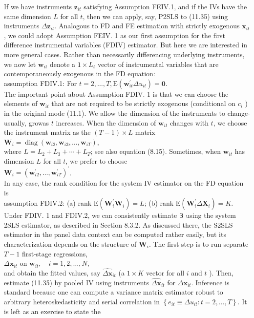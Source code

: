 \documentclass[10pt]{article}
\begin{document}
If we have instruments $\mathbf{z}_{i t}$ satisfying Assumption FEIV.1, and if the IVs have the same dimension $L$ for all $t$, then we can apply, say, P2SLS to (11.35) using instruments $\Delta \mathbf{z}_{i t}$. Analogous to FD and FE estimation with strictly exogenous $\mathbf{x}_{i t}$, we could adopt Assumption FEIV. 1 as our first assumption for the first difference instrumental variables (FDIV) estimator. But here we are interested in more general cases. Rather than necessarily differencing underlying instruments, we now let $\mathbf{w}_{i t}$ denote a $1 \times L_{t}$ vector of instrumental variables that are contemporaneously exogenous in the FD equation:\\
assumption FDIV.1: For $t=2, \ldots, T, \mathrm{E}\left(\mathbf{w}_{i t}^{\prime} \Delta u_{i t}\right)=\mathbf{0}$.\\
The important point about Assumption FDIV. 1 is that we can choose the elements of $\mathbf{w}_{i t}$ that are not required to be strictly exogenous (conditional on $c_{i}$ ) in the original mode (11.1). We allow the dimension of the instruments to change-usually, growas $t$ increases. When the dimension of $\mathbf{w}_{i t}$ changes with $t$, we choose the instrument matrix as the $(T-1) \times L$ matrix\\
$\mathbf{W}_{i}=\operatorname{diag}\left(\mathbf{w}_{i 2}, \mathbf{w}_{i 3}, \ldots, \mathbf{w}_{i T}\right)$,\\
where $L=L_{2}+L_{3}+\cdots+L_{T}$; see also equation (8.15). Sometimes, when $\mathbf{w}_{i t}$ has dimension $L$ for all $t$, we prefer to choose\\
$\mathbf{W}_{i}=\left(\mathbf{w}_{i 2}^{\prime}, \ldots, \mathbf{w}_{i T}^{\prime}\right)^{\prime}$.\\
In any case, the rank condition for the system IV estimator on the FD equation is\\
assumption FDIV.2: (a) rank $\mathrm{E}\left(\mathbf{W}_{i}^{\prime} \mathbf{W}_{i}\right)=L$; (b) rank $\mathrm{E}\left(\mathbf{W}_{i}^{\prime} \Delta \mathbf{X}_{i}\right)=K$.\\
Under FDIV. 1 and FDIV.2, we can consistently estimate $\boldsymbol{\beta}$ using the system 2SLS estimator, as described in Section 8.3.2. As discussed there, the S2SLS estimator in the panel data context can be computed rather easily, but its characterization depends on the structure of $\mathbf{W}_{i}$. The first step is to run separate $T-1$ first-stage regressions,\\
$\Delta \mathbf{x}_{i t}$ on $\mathbf{w}_{i t}, \quad i=1,2, \ldots, N$,\\
and obtain the fitted values, say $\widehat{\Delta \mathbf{x}}_{i t}$ (a $1 \times K$ vector for all $i$ and $t$ ). Then, estimate (11.35) by pooled IV using instruments $\widehat{\Delta \mathbf{x}}_{i t}$ for $\Delta \mathbf{x}_{i t}$. Inference is standard because one can compute a variance matrix estimator robust to arbitrary heteroskedasticity and serial correlation in $\left\{e_{i t} \equiv \Delta u_{i t}: t=2, \ldots, T\right\}$. It is left as an exercise to state the
\end{document}
